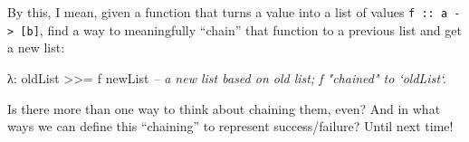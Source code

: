\documentclass[]{article}
\newenvironment{Shaded}{}{}
\newcommand{\CommentTok}[1]{\textcolor[rgb]{0.38,0.63,0.69}{\textit{{#1}}}}
\newcommand{\FunctionTok}[1]{\textcolor[rgb]{0.02,0.16,0.49}{{#1}}}
\newcommand{\NormalTok}[1]{{#1}}
\begin{document}
By this, I mean, given a function that turns a value into a list of values
\texttt{f\ ::\ a\ -\textgreater{}\ {[}b{]}}, find a way to meaningfully ``chain'' that function to a
previous list and get a new list:

\begin{Shaded}
\begin{Highlighting}[]
\NormalTok{λ}\FunctionTok{:} \NormalTok{oldList }\FunctionTok{>>=} \NormalTok{f}
\NormalTok{newList             }\CommentTok{-- a new list based on old list; f "chained" to `oldList`.}
\end{Highlighting}
\end{Shaded}

Is there more than one way to think about chaining them, even? And in what ways we can define this
``chaining'' to represent success/failure? Until next time!
\end{document}
